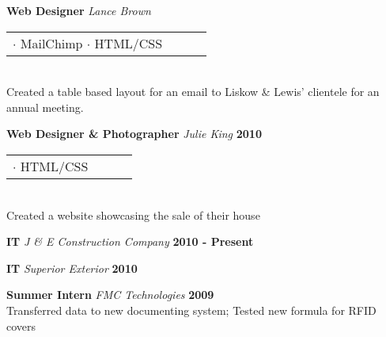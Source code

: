\documentclass[margin,line]{res}
\begin{document}
{\begin{resume}
{\bf Web Designer} {\em Lance Brown} \hfill %
\\
\begin{tabular}{l l l l}
    $\cdot$ MailChimp $\cdot$ HTML/CSS
\end{tabular}
\\
\hspace*{.14pt}
Created a table based layout for an email to Liskow \& Lewis'
clientele for an annual meeting.
\vspace{-.13in}


{\bf Web Designer \& Photographer} {\em Julie King} \hfill {\bf 2010} \
\\
\begin{tabular}{l l l l}
  $\cdot$ HTML/CSS &
\end{tabular}
\\
\hspace*{.14pt}
Created a website showcasing the sale of their house
\vspace{-.13in}

{\bf IT} {\em J \& E Construction Company} \hfill {\bf 2010 - Present}
\vspace{-.13in}

{\bf IT} {\em Superior Exterior} \hfill {\bf 2010}
\vspace{-.13in}

{\bf Summer Intern} {\em FMC Technologies} \hfill {\bf 2009} \
\\
\hspace*{.14pt}
Transferred data to new documenting system; Tested new formula for RFID covers


\end{resume}}
\end{document}
